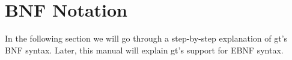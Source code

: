 \section{BNF Notation}
In the following section we will go through a step-by-step explanation of gt's BNF syntax. Later, this manual 
will explain gt's support for EBNF syntax.


